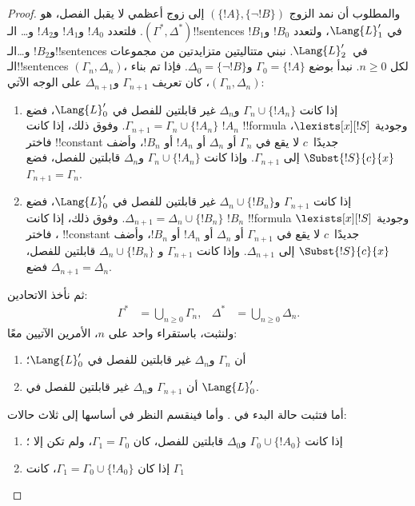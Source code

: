 \documentclass[../../../include/open-logic-section]{subfiles}
\begin{document}
\begin{proof}
والمطلوب أن نمد الزوج $(\{!A\},\{\lnot!B\})$ إلى زوج أعظمي لا يقبل الفصل،
هو $(\Gamma^*,\Delta^*)$. فلتعدد $!A_0$ و$!A_1$ و$!A_2$ و\dots
الـ!!{sentence}s في $\Lang{L}'_1$، ولتعدد $!B_0$ و$!B_1$ و$!B_2$
و\dots الـ!!{sentence}s في~$\Lang{L}'_2$. نبني متتاليتين متزايدتين من
مجموعات الـ!!{sentence}s $(\Gamma_n,\Delta_n)$، لكل $n \ge 0$.
نبدأ بوضع $\Gamma_0=\{!A\}$ و$\Delta_0=\{\lnot !B\}$. فإذا تم بناء
$(\Gamma_n,\Delta_n)$، كان تعريف $\Gamma_{n+1}$ و$\Delta_{n+1}$
على الوجه الآتي:
\begin{enumerate}
\item إذا كانت $\Gamma_n \cup \{!A_n\}$ و$\Delta_n$ غير قابلتين
  للفصل في $\Lang{L}'_0$، فضع
  $\Gamma_{n+1}=\Gamma_n \cup \{!A_n\}$. وفوق ذلك، إذا كانت $!A_n$
  !!{formula} وجودية $\lexists[x][!S]$، فاختر !!{constant} جديدًا~$c$
  لا يقع في $\Gamma_n$ أو $\Delta_n$ أو $!A_n$ أو $!B_n$، وأضف
  $\Subst{!S}{c}{x}$ إلى $\Gamma_{n+1}$. وإذا كانت
  $\Gamma_n \cup \{!A_n\}$ و$\Delta_n$ قابلتين للفصل، فضع
  $\Gamma_{n+1}=\Gamma_n$.
\item إذا كانت $\Gamma_{n+1}$ و$\Delta_n \cup \{!B_n\}$ غير قابلتين
  للفصل في $\Lang{L}'_0$، فضع
  $\Delta_{n+1}=\Delta_n \cup \{!B_n\}$. وفوق ذلك، إذا كانت $!B_n$
  !!{formula} وجودية $\lexists[x][!S]$، فاختر !!{constant} جديدًا~$c$
  لا يقع في $\Gamma_{n+1}$ أو $\Delta_n$ أو $!A_n$ أو $!B_n$، وأضف
  $\Subst{!S}{c}{x}$ إلى $\Delta_{n+1}$. وإذا كانت $\Gamma_{n+1}$ و
  $\Delta_n \cup \{!B_n\}$ قابلتين للفصل، فضع
  $\Delta_{n+1}=\Delta_n$.
\end{enumerate}
ثم نأخذ الاتحادين:
\begin{align*}
  \Gamma^* & = \bigcup_{n\ge 0} \Gamma_n, &
  \Delta^* & = \bigcup_{n\ge 0} \Delta_n.
\end{align*}
ولنثبت، باستقراء واحد على $n$، الأمرين الآتيين معًا:
\begin{enumerate}
\item{} أن $\Gamma_n$ و$\Delta_n$ غير قابلتين للفصل في
  $\Lang{L}'_0$؛
\item{} أن $\Gamma_{n+1}$ و$\Delta_n$ غير قابلتين للفصل
  في $\Lang{L}'_0$.
\end{enumerate}
أما  فتثبت حالة البدء في . وأما
 فينقسم النظر في أساسها إلى ثلاث حالات:
\begin{enumerate}
\item إذا كانت $\Gamma_0 \cup \{!A_0\}$ و$\Delta_0$ قابلتين للفصل،
  كان $\Gamma_1=\Gamma_0$، ولم تكن  إلا
  ؛
\item إذا كان $\Gamma_1=\Gamma_0 \cup \{!A_0\}$، كانت $\Gamma_1$

\end{enumerate}
\end{proof}
\end{document}
